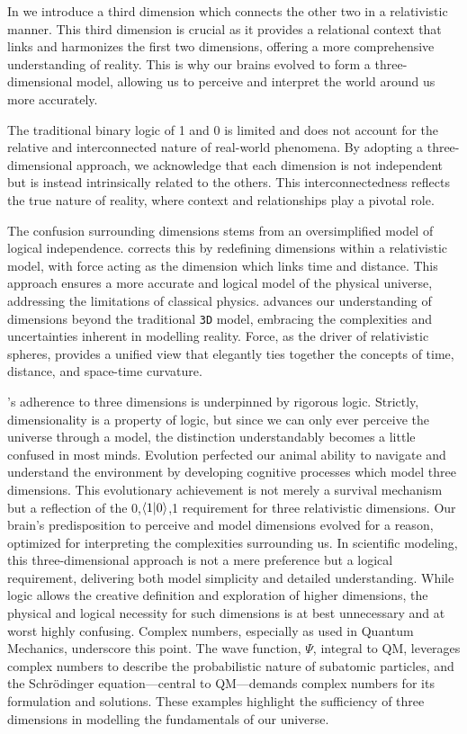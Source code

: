 \documentclass[12pt]{article}
\begin{document}
In \iR{} we introduce a third dimension which connects the other two in a relativistic manner. This third dimension is crucial as it provides a relational context that links and harmonizes the first two dimensions, offering a more comprehensive understanding of reality. This is why our brains evolved to form a three-dimensional model, allowing us to perceive and interpret the world around us more accurately.

The traditional binary logic of 1 and 0 is limited and does not account for the relative and interconnected nature of real-world phenomena. By adopting a three-dimensional approach, we acknowledge that each dimension is not independent but is instead intrinsically related to the others. This interconnectedness reflects the true nature of reality, where context and relationships play a pivotal role.

The confusion surrounding dimensions stems from an oversimplified model of logical independence. \iR{} corrects this by redefining dimensions within a relativistic model, with force acting as the dimension which links time and distance. This approach ensures a more accurate and logical model of the physical universe, addressing the limitations of classical physics. \iR{} advances our understanding of dimensions beyond the traditional \texttt{3D} model, embracing the complexities and uncertainties inherent in modelling reality. Force, as the driver of relativistic spheres, provides a unified view that elegantly ties together the concepts of time, distance, and space-time curvature.

\iR{}'s adherence to three dimensions is underpinned by rigorous logic. Strictly, dimensionality is a property of logic, but since we can only ever perceive the universe through a model, the distinction understandably becomes a little confused in most minds. Evolution perfected our animal ability to navigate and understand the environment by developing cognitive processes which model three dimensions. This evolutionary achievement is not merely a survival mechanism but a reflection of the {0,\(\langle 1 | 0 \rangle\),1} requirement for three relativistic dimensions. Our brain's predisposition to perceive and model dimensions evolved for a reason, optimized for interpreting the complexities surrounding us. In scientific modeling, this three-dimensional approach is not a mere preference but a logical requirement, delivering both model simplicity and detailed understanding. While logic allows the creative definition and exploration of higher dimensions, the physical and logical necessity for such dimensions is at best unnecessary and at worst highly confusing. Complex numbers, especially as used in Quantum Mechanics, underscore this point. The wave function, \(\Psi\), integral to QM, leverages complex numbers to describe the probabilistic nature of subatomic particles, and the Schrödinger equation—central to QM—demands complex numbers for its formulation and solutions. These examples highlight the sufficiency of three dimensions in modelling the fundamentals of our universe.
\end{document}
